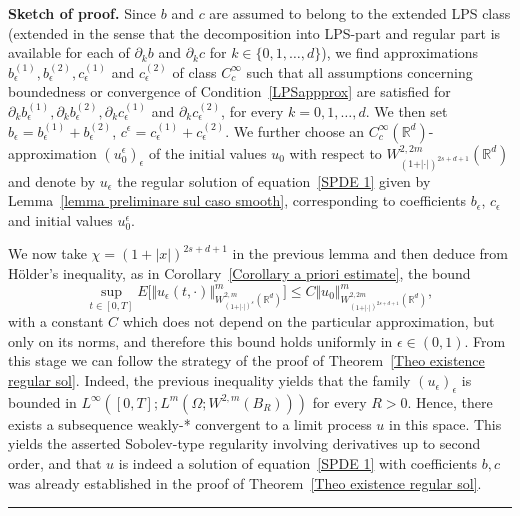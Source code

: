 \documentclass[a4paper,10pt]{article}
\newenvironment{proof}[1][Proof]{\noindent\textbf{#1.} }{\ \rule{0.5em}{0.5em}}
\newcommand{\mr}{\mathbb{R}}
\newcommand{\eps}{\epsilon}
\begin{document}
\begin{proof}[Sketch of proof]
Since $b$ and $c$ are assumed to belong to the extended LPS class (extended in the sense that the decomposition into LPS-part and regular part is available for each of $\partial_k b$ and $\partial_k c$ for $k \in \{0,1,\ldots, d\}$), we find approximations $b_{\epsilon}^{(1)}, b_{\epsilon}^{(2)}, c_{\epsilon}^{(1)}$ and $c_{\epsilon}^{(2)}$ of class $C_{c}^{\infty}$ such that all assumptions concerning boundedness or convergence of Condition~\ref{LPSappprox} are satisfied for $\partial_k b_{\epsilon}^{(1)}, \partial_k b_{\epsilon}^{(2)}, \partial_k c_{\epsilon}^{(1)}$ and $\partial_k c_{\epsilon}^{(2)}$, for every $k=0,1,\ldots,d$. We then set  $b_{\epsilon}=b_{\epsilon}^{(1)}+b_{\epsilon}^{(2)}$,  $c^{\epsilon}=c_{\epsilon}^{(1)} + c_{\epsilon}^{(2)}$. We further choose an $C^\infty_c(\mr^d)$-approximation $(u_0^\epsilon)_\epsilon$ of the initial values $u_0$ with respect to $W_{(1+\vert \cdot\vert )^{2s+d+1}}^{2,2m}(\mathbb{R}^{d})$ and denote by $u_{\epsilon}$ the regular solution of equation~\eqref{SPDE 
1} 
given by Lemma~\ref{lemma preliminare sul caso smooth}, corresponding to coefficients $b_\eps$, $c_\eps$ and initial values $u_0^\epsilon$.

We now take $\chi = (1+|x|)^{2s+d+1}$ in the previous lemma and then deduce from H\"older's inequality, as in Corollary~\ref{Corollary a priori estimate}, the bound
\begin{equation*}
\sup_{t\in [0,T]}E \Big[ \Vert u_\eps(t,\cdot)\Vert_{W_{(1+\vert \cdot \vert)^{s}}^{2,m}(\mathbb{R}^{d})}^{m} \Big] \leq C \Vert u_{0} \Vert_{W_{(1+\vert \cdot \vert)^{2s+d+1}}^{2,2m}(\mathbb{R}^{d})}^{m},
\end{equation*}
with a constant $C$ which does not depend on the particular approximation, but only on its norms, and therefore this bound holds uniformly in $\epsilon \in (0,1)$. From this stage we can follow the strategy of the proof of Theorem~\ref{Theo existence regular sol}. Indeed, the previous inequality yields that the family $(u_\eps)_\eps$ is bounded in $L^\infty([0,T];L^m(\Omega;W^{2,m}(B_R)))$ for every $R>0$. Hence, there exists a subsequence weakly-* convergent to a limit process $u$ in this space. This yields the asserted Sobolev-type regularity involving derivatives up to second order, and that $u$ is indeed a solution of equation~\eqref{SPDE 1} with coefficients $b,c$ was already established in the proof of Theorem~\ref{Theo existence regular sol}.
\end{proof}
\end{document}

